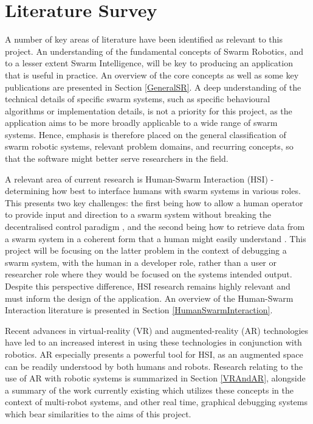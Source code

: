\documentclass[hidelinks,10pt]{article}
\begin{document}
\section{Literature Survey} \label{LitSurvey}
A number of key areas of literature have been identified as relevant to this project. An understanding of the fundamental concepts of Swarm Robotics, and to a lesser extent Swarm Intelligence, will be key to producing an application that is useful in practice. An overview of the core concepts as well as some key publications are presented in Section \ref{GeneralSR}. A deep understanding of the technical details of specific swarm systems, such as specific behavioural algorithms or implementation details, is not a priority for this project, as the application aims to be more broadly applicable to a wide range of swarm systems. Hence, emphasis is therefore placed on the general classification of swarm robotic systems, relevant problem domains, and recurring concepts, so that the software might better serve researchers in the field.

A relevant area of current research is Human-Swarm Interaction (HSI) - determining how best to interface humans with swarm systems in various roles. This presents two key challenges: the first being how to allow a human operator to provide input and direction to a swarm system without breaking the decentralised control paradigm \cite{HumanSwarmInteractionSurvey}, and the second being how to retrieve data from a swarm system in a coherent form that a human might easily understand \cite{DesginingInterfaces}. This project will be focusing on the latter problem in the context of debugging a swarm system, with the human in a developer role, rather than a user or researcher role where they would be focused on the systems intended output. Despite this perspective difference, HSI research remains highly relevant and must inform the design of the application. An overview of the Human-Swarm Interaction literature is presented in Section \ref{HumanSwarmInteraction}.

Recent advances in virtual-reality (VR) and augmented-reality (AR) technologies have led to an increased interest in using these technologies in conjunction with robotics. AR especially presents a powerful tool for HSI, as an augmented space can be readily understood by both humans and robots. Research relating to the use of AR with robotic systems is summarized in Section \ref{VRAndAR}, alongside a summary of the work currently existing which utilizes these concepts in the context of multi-robot systems, and other real time, graphical debugging systems which bear similarities to the aims of this project.
\end{document}
